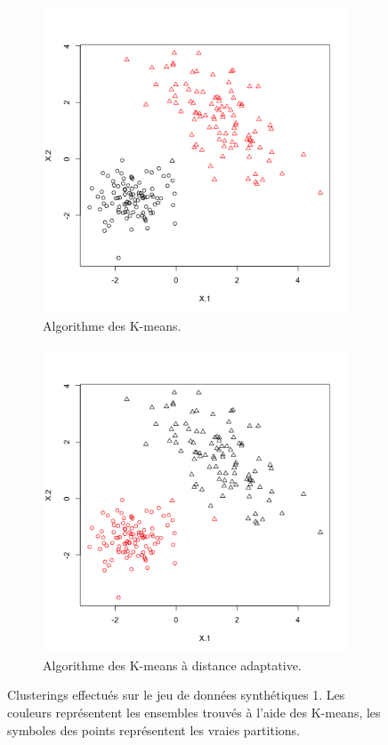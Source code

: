 \documentclass[a4paper,11pt,oneside,roman]{article}
\begin{document}
    \begin{figure}
        \centering
        \begin{subfigure}{.5\textwidth}
          \centering
          \includegraphics[width=.8\linewidth]{imgs/K_means_synth_1.png}
          \caption{Algorithme des K-means.}
        \end{subfigure}%
        \begin{subfigure}{.5\textwidth}
          \centering
          \includegraphics[width=.8\linewidth]{imgs/K_means_adapt_synth_1.png}
          \caption{Algorithme des K-means à distance adaptative.}
        \end{subfigure}
        \caption{Clusterings effectués sur le jeu de données synthétiques 1. Les couleurs représentent les ensembles trouvés à l'aide des K-means, les symboles des points représentent les vraies partitions.}
        \label{fig_synth_1}
    \end{figure}
\end{document}
